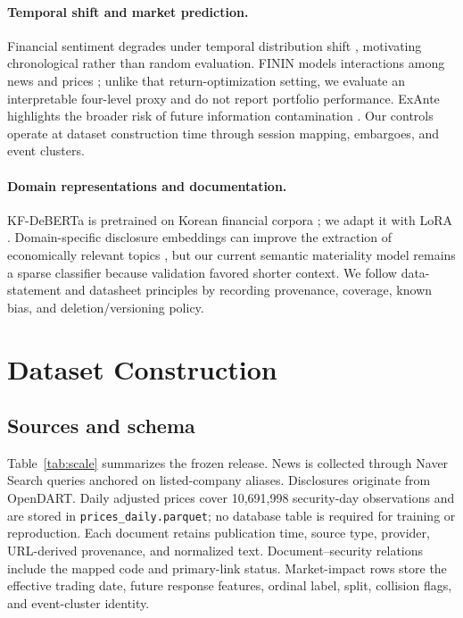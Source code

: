 \documentclass[11pt]{article}
\begin{document}
\paragraph{Temporal shift and market prediction.}
Financial sentiment degrades under temporal distribution shift \citep{guo-etal-2023-predict}, motivating chronological rather than random evaluation. FININ models interactions among news and prices \citep{wang-etal-2024-modeling}; unlike that return-optimization setting, we evaluate an interpretable four-level proxy and do not report portfolio performance. ExAnte highlights the broader risk of future information contamination \citep{liu-etal-2026-exante}. Our controls operate at dataset construction time through session mapping, embargoes, and event clusters.

\paragraph{Domain representations and documentation.}
KF-DeBERTa is pretrained on Korean financial corpora \citep{jeon-etal-2023-kfdeberta}; we adapt it with LoRA \citep{hu-etal-2022-lora}. Domain-specific disclosure embeddings can improve the extraction of economically relevant topics \citep{jehnen-etal-2026-fintextsim}, but our current semantic materiality model remains a sparse classifier because validation favored shorter context. We follow data-statement and datasheet principles \citep{bender-friedman-2018-data,gebru-etal-2021-datasheets} by recording provenance, coverage, known bias, and deletion/versioning policy.

\section{Dataset Construction}

\subsection{Sources and schema}

Table~\ref{tab:scale} summarizes the frozen release. News is collected through Naver Search queries anchored on listed-company aliases. Disclosures originate from OpenDART. Daily adjusted prices cover 10,691,998 security-day observations and are stored in \texttt{prices\_daily.parquet}; no database table is required for training or reproduction. Each document retains publication time, source type, provider, URL-derived provenance, and normalized text. Document--security relations include the mapped code and primary-link status. Market-impact rows store the effective trading date, future response features, ordinal label, split, collision flags, and event-cluster identity.
\end{document}
